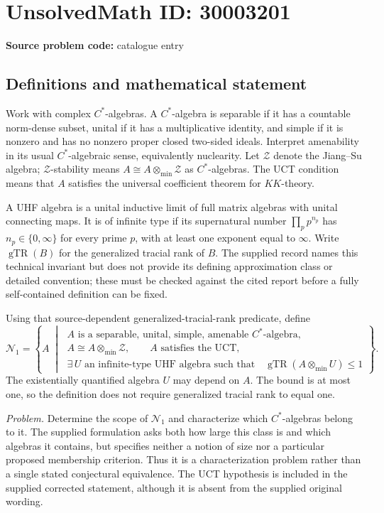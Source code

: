 \documentclass[11pt]{article}
\begin{document}
\section*{UnsolvedMath ID: 30003201}
\textbf{Source problem code:} catalogue entry
\subsection{Definitions and mathematical statement}
Work with complex \(C^*\)-algebras. A \(C^*\)-algebra is separable if it has a countable norm-dense subset, unital if it has a multiplicative identity, and simple if it is nonzero and has no nonzero proper closed two-sided ideals. Interpret amenability in its usual \(C^*\)-algebraic sense, equivalently nuclearity. Let \(\mathcal Z\) denote the Jiang--Su algebra; \(\mathcal Z\)-stability means \(A\cong A\otimes_{\min}\mathcal Z\) as \(C^*\)-algebras. The UCT condition means that \(A\) satisfies the universal coefficient theorem for \(KK\)-theory.

A UHF algebra is a unital inductive limit of full matrix algebras with unital connecting maps. It is of infinite type if its supernatural number \(\prod_p p^{n_p}\) has \(n_p\in\{0,\infty\}\) for every prime \(p\), with at least one exponent equal to \(\infty\). Write \(\operatorname{gTR}(B)\) for the generalized tracial rank of \(B\). The supplied record names this technical invariant but does not provide its defining approximation class or detailed convention; these must be checked against the cited report before a fully self-contained definition can be fixed.

Using that source-dependent generalized-tracial-rank predicate, define
\[
\mathcal N_1=\left\{A\;\middle|\;
\begin{gathered}
A\text{ is a separable, unital, simple, amenable }C^*\text{-algebra},\\
A\cong A\otimes_{\min}\mathcal Z,\qquad A\text{ satisfies the UCT},\\
\exists\,U\text{ an infinite-type UHF algebra such that}
\quad\operatorname{gTR}(A\otimes_{\min}U)\leq 1
\end{gathered}
\right\}.
\]
The existentially quantified algebra \(U\) may depend on \(A\). The bound is at most one, so the definition does not require generalized tracial rank to equal one.

\emph{Problem.} Determine the scope of \(\mathcal N_1\) and characterize which \(C^*\)-algebras belong to it. The supplied formulation asks both how large this class is and which algebras it contains, but specifies neither a notion of size nor a particular proposed membership criterion. Thus it is a characterization problem rather than a single stated conjectural equivalence. The UCT hypothesis is included in the supplied corrected statement, although it is absent from the supplied original wording.
\end{document}
